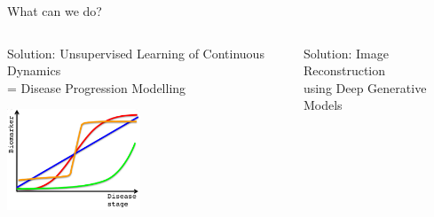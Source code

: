\documentclass[8pt,xcolor=table,aspectratio=169]{beamer}
\begin{document}
\begin{frame}{What can we do?}
\begin{columns}[t]
\begin{column}{0.5\textwidth}
\vspace{2em}




\end{column}
\end{columns}


\begin{columns}[t]
\begin{column}{0.5\textwidth}
\centering

Solution: Unsupervised Learning of Continuous Dynamics\\
= Disease Progression Modelling\\
\vo

\includegraphics[height=3cm]{dpm_small}

\end{column}
\begin{column}{0.5\textwidth}
\centering

Solution: Image Reconstruction\\ using Deep Generative Models\\
\vo
\brgmoursshort

\end{column}
\end{columns}

\end{frame}
\end{document}
